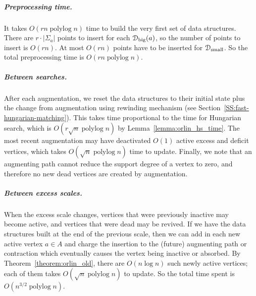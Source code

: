 \documentclass[a4paper,UKenglish]{socg-lipics-v2018}
\def\polylog{\mathop{\mathrm{polylog}}}
\def\abs#1{\mathopen| #1 \mathclose|}		%
\theoremstyle{plain}
\numberwithin{figure}{section}
\renewcommand{\paragraph}{\subparagraph}
\begin{document}
\paragraph{Preprocessing time.}
It takes $O(rn\polylog n)$ time to build the very first set of data structures.
There are $r \cdot \abs{\Sigma_a}$ points to insert for each $\EuScript{D}_\text{big}(a)$,
so the number of points to insert is $O(rn)$.
At most $O(rn)$ points have to be inserted for $\EuScript{D}_\text{small}$.
So the total preprocessing time is $O(rn\polylog n)$.

\paragraph{Between searches.}
After each augmentation, we reset the data structures to their initial
state plus the change from augmentation using rewinding mechanism (see Section~\ref{SS:fast-hungarian-matching}).
This takes time proportional to the time for Hungarian search,
which is $O(r\sqrt{n}\polylog n)$ by Lemma~\ref{lemma:orlin_hs_time}.
The most recent augmentation may have deactivated $O(1)$ active excess and deficit vertices, which takes
$O(\sqrt{n}\polylog n)$ time to update.
Finally, we note that an augmenting path cannot reduce the support degree of
a vertex to zero, and therefore no new dead vertices are created by augmentation.

\paragraph{Between excess scales.}
When the excess scale changes, vertices that were previously inactive may
become active, and vertices that were dead may be revived.
If we have the data structures built at the end of the
previous scale, then we can add in each new active vertex $a \in A$ and
charge the insertion to the (future) augmenting path or contraction which
eventually causes the vertex being inactive or absorbed.
By Theorem~\ref{theorem:orlin_old}, there are $O(n\log n)$ such newly active
vertices; each of them takes $O(\sqrt{n}\polylog n)$ to update.
So the total time spent is $O(n^{3/2}\polylog n)$.
\end{document}
